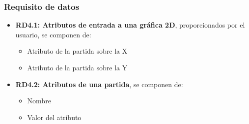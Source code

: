 \subsubsection{Requisito de datos}
\begin{itemize}
	\item \textbf{RD4.1: Atributos de entrada a una gráfica 2D}, proporcionados por el usuario, se componen de:
	\begin{itemize}
		\item Atributo de la partida sobre la X
		\item Atributo de la partida sobre la Y
	\end{itemize}
	
	\item \textbf{RD4.2: Atributos de una partida}, se componen de:
	\begin{itemize}
		\item Nombre
		\item Valor del atributo
	\end{itemize}
	
\end{itemize}
